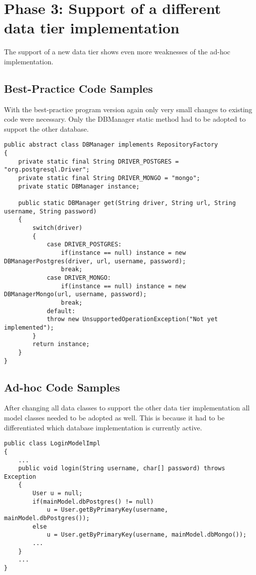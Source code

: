 \section{Phase 3: Support of a different data tier implementation}
The support of a new data tier shows even more weaknesses of the ad-hoc implementation.

\subsection{Best-Practice Code Samples}
With the best-practice program version again only very small changes to existing code were necessary. Only the DBManager static method had to be adopted to support the other database.

\begin{lstlisting}[caption={DBManager implementation after support for a second database. Again only a branch of the switch-statement has to be added.}, captionpos=b]
public abstract class DBManager implements RepositoryFactory
{
	private static final String DRIVER_POSTGRES = "org.postgresql.Driver";
	private static final String DRIVER_MONGO = "mongo";
	private static DBManager instance;
	
	public static DBManager get(String driver, String url, String username, String password)
	{
		switch(driver)
		{
			case DRIVER_POSTGRES:
				if(instance == null) instance = new DBManagerPostgres(driver, url, username, password);
				break;
			case DRIVER_MONGO:
				if(instance == null) instance = new DBManagerMongo(url, username, password);
				break;
			default:
			throw new UnsupportedOperationException("Not yet implemented");
		}
		return instance;
	}
}
\end{lstlisting}

\subsection{Ad-hoc Code Samples}
\label{sec:static-code-samples}
After changing all data classes to support the other data tier implementation all model classes needed to be adopted as well. This is because it had to be differentiated which database implementation is currently active. 

\begin{lstlisting}[caption={Code of the login-process after implementing support of the second database in the ad-hoc version of the program. Again because the application does not rely on interfaces as in listing \ref{lst:controller-switch} it has to be differentiated each time database access is needed. The methods for database code are overloaded.}, captionpos=b]
public class LoginModelImpl
{
	...
	public void login(String username, char[] password) throws Exception
	{
		User u = null;
		if(mainModel.dbPostgres() != null)
			u = User.getByPrimaryKey(username, mainModel.dbPostgres());
		else
			u = User.getByPrimaryKey(username, mainModel.dbMongo());
		...
	}
	...
}
\end{lstlisting}